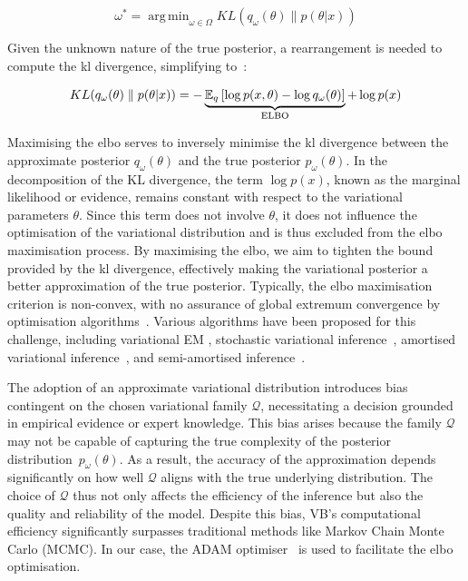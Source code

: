 \documentclass[3p,review,authoryear]{elsarticle}
\DeclareMathOperator*{\argmin}{arg\,min}
\begin{document}
\begin{equation}
\omega^* = \argmin_{\omega \in \Omega}KL(q_\omega(\theta) \parallel p(\theta|x))
\label{eq:optim}
\end{equation}

Given the unknown nature of the true posterior, a rearrangement is needed to compute the \gls{kl} divergence, simplifying to~\citep[Chapter~10]{murphy2023probabilistic}:

\begin{equation}
KL(q_\omega(\theta) \parallel p(\theta|x)) = -\underbrace{\mathbb{E}_q\left[\log p(x,\theta) - \log q_\omega(\theta)\right]}_{\text{ELBO}}+ \log p(x)\\
\label{eq:kl_divergence}
\end{equation}

Maximising the \gls{elbo} serves to inversely minimise the \gls{kl} divergence between the approximate posterior \(q_\omega(\theta)\) and the true posterior \(p_\omega(\theta)\).
In the decomposition of the KL divergence, the term \(\log p(x)\), known as the marginal likelihood or evidence, remains constant with respect to the variational parameters \(\theta\).
Since this term does not involve \(\theta\), it does not influence the optimisation of the variational distribution and is thus excluded from the \gls{elbo} maximisation process.
By maximising the \gls{elbo}, we aim to tighten the bound provided by the \gls{kl} divergence, effectively making the variational posterior a better approximation of the true posterior.
Typically, the \gls{elbo} maximisation criterion is non-convex, with no assurance of global extremum convergence by optimisation algorithms~\citep[Chapter~10]{murphy2023probabilistic}.
Various algorithms have been proposed for this challenge, including variational EM \citep{bernardo2003variational}, stochastic variational inference~\citep{hoffman2013stochastic, sashank2018convergence}, amortised variational inference~\citep{gershman2014amortized, le2017inference}, and semi-amortised inference~\citep{kim2018semi}.

The adoption of an approximate variational distribution introduces bias contingent on the chosen variational family $\mathcal{Q}$, necessitating a decision grounded in empirical evidence or expert knowledge.
This bias arises because the family \(\mathcal{Q}\) may not be capable of capturing the true complexity of the posterior distribution~\(p_\omega(\theta)\).
As a result, the accuracy of the approximation depends significantly on how well \(\mathcal{Q}\) aligns with the true underlying distribution.
The choice of \(\mathcal{Q}\) thus not only affects the efficiency of the inference but also the quality and reliability of the model.
Despite this bias, VB's computational efficiency significantly surpasses traditional methods like Markov Chain Monte Carlo (MCMC).
In our case, the ADAM optimiser~\citep{kingma2014adam} is used to facilitate the \gls{elbo} optimisation.
\end{document}
